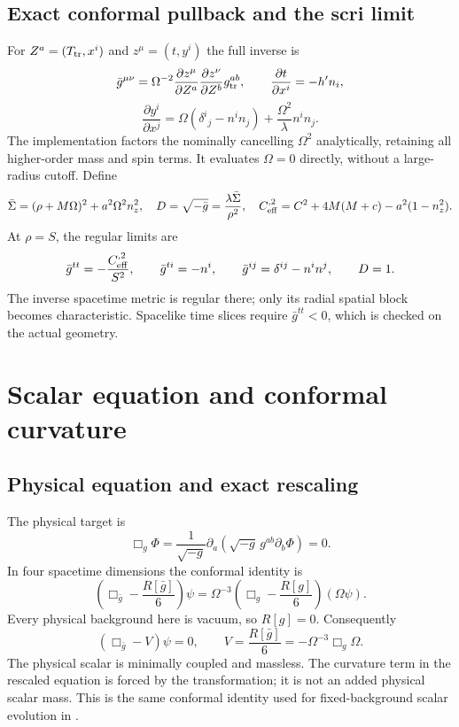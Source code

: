 \documentclass[11pt,letterpaper]{article}
\newcommand{\G}{\bar g}
\begin{document}
\subsection{Exact conformal pullback and the scri limit}
For $Z^a=(T_{\rm tr},x^i)$ and $z^\mu=(t,y^i)$ the full inverse is
\begin{equation}\label{eq:pullback}
 \G^{\mu\nu}=\Omega^{-2}
 \frac{\partial z^\mu}{\partial Z^a}\frac{\partial z^\nu}{\partial Z^b}g_{\rm tr}^{ab},
 \qquad \frac{\partial t}{\partial x^i}=-h'n_i,
\end{equation}
\begin{equation}
 \frac{\partial y^i}{\partial x^j}
 =\Omega(\delta^i{}_j-n^in_j)+\frac{\Omega^2}{\lambda}n^in_j.
\end{equation}
The implementation factors the nominally cancelling $\Omega^2$ analytically, retaining all higher-order mass and spin terms. It evaluates $\Omega=0$ directly, without a large-radius cutoff. Define
\begin{equation}
 \bar\Sigma=(\rho+M\Omega)^2+a^2\Omega^2n_z^2,\quad
 D=\sqrt{-\G}=\frac{\lambda\bar\Sigma}{\rho^2},\quad
 C_{\rm eff}^{,2}=C^2+4M(M+c)-a^2(1-n_z^2).
\end{equation}
At $\rho=S$, the regular limits are
\begin{equation}\label{eq:scrilimit}
 \G^{tt}=-\frac{C_{\rm eff}^{,2}}{S^2},\qquad
 \G^{ti}=-n^i,\qquad \G^{ij}=\delta^{ij}-n^in^j,\qquad D=1.
\end{equation}
The inverse spacetime metric is regular there; only its radial spatial block becomes characteristic. Spacelike time slices require $\G^{tt}<0$, which is checked on the actual geometry.

\clearpage
\section{Scalar equation and conformal curvature}
\subsection{Physical equation and exact rescaling}
The physical target is
\begin{equation}\label{eq:physical}
 \Box_g\Phi=\frac{1}{\sqrt{-g}}\partial_a\!\left(\sqrt{-g}\,g^{ab}\partial_b\Phi\right)=0.
\end{equation}
In four spacetime dimensions the conformal identity is
\begin{equation}\label{eq:confid}
 \left(\Box_{\G}-\frac{R[\G]}{6}\right)\psi
 =\Omega^{-3}\left(\Box_g-\frac{R[g]}{6}\right)(\Omega\psi).
\end{equation}
Every physical background here is vacuum, so $R[g]=0$. Consequently
\begin{equation}\label{eq:conformal}
 (\Box_{\G}-V)\psi=0,\qquad
 V=\frac{R[\G]}6=-\Omega^{-3}\Box_g\Omega.
\end{equation}
The physical scalar is minimally coupled and massless. The curvature term in the rescaled equation is forced by the transformation; it is not an added physical scalar mass. This is the same conformal identity used for fixed-background scalar evolution in \cite{matching}.
\end{document}
